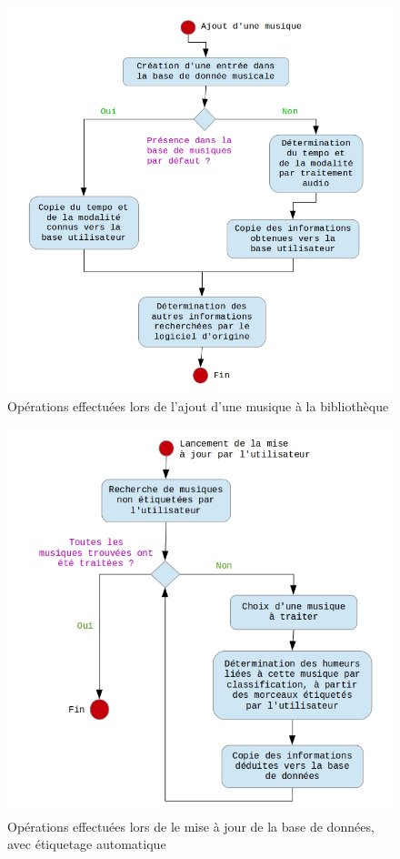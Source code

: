 \begin{figure}[htp]
\centering
\includegraphics[scale=0.5]{./images/SchemaAjoutMusique2.jpg}
\caption{Opérations effectuées lors de l'ajout d'une musique à la bibliothèque}
\label{ds2}
\end{figure}

\begin{figure}[htp]
\centering
\includegraphics[scale=0.5]{./images/SchemaMiseAJour2.jpg}
\caption{Opérations effectuées lors de le mise à jour de la base de données, avec étiquetage automatique}
\label{ds3}
\end{figure}